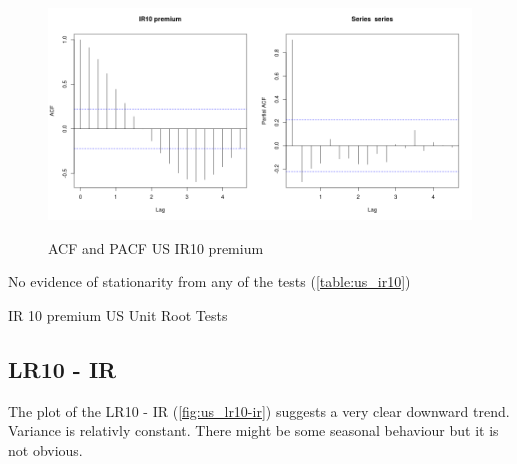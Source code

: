 \documentclass[10pt]{article}
\begin{document}
\begin{figure}[h!]
\centering
\includegraphics[width = 0.5\textwidth]{"../acf/us_IR10 premium"}\includegraphics[width = 0.5\textwidth]{"../pacf/us_IR10 premium"}
\caption{ACF and PACF US IR10 premium}
\label{fig:us_ir10prem-ir_acf}
\end{figure}

No evidence of stationarity from any of the tests (\autoref{table:us_ir10})

\begin{table}[h!]
\centering
{}
\caption{IR 10 premium US Unit Root Tests}
\label{table:us_ir10}
\end{table}

\subsection{LR10 - IR}

The plot of the LR10 - IR (\autoref{fig:us_lr10-ir}) suggests a very clear downward trend. Variance is relativly constant. There might be some seasonal behaviour but it is not obvious.
\end{document}
